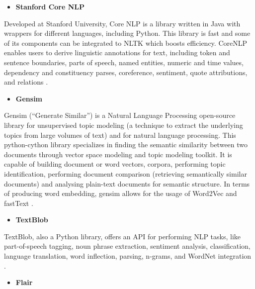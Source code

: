         \begin{itemize}
            \item\textbf{Stanford Core NLP}
        \end{itemize}
      

        \par Developed at Stanford University, Core NLP is a library written in Java with wrappers for different languages, including Python. This library is fast and some of its components can be integrated to NLTK which boosts efficiency. CoreNLP enables users to derive linguistic annotations for text, including token and sentence boundaries, parts of speech, named entities, numeric and time values, dependency and constituency parses, coreference, sentiment, quote attributions, and relations \cite{Manning2015}.

        \begin{itemize}
            \item\textbf{Gensim}
        \end{itemize}

    

        \par Gensim (\enquote{Generate Similar}) is a Natural Language Processing open-source library for unsupervised topic modeling (a technique to extract the underlying topics from large volumes of text)  and for natural language processing. This python-cython library specializes in finding the semantic similarity between two documents through vector space modeling and topic modeling toolkit. It is capable of building document or word vectors, corpora, performing topic identification, performing document comparison (retrieving semantically similar documents) and analysing plain-text documents for semantic structure. In terms of producing word embedding, gensim allows for the usage of Word2Vec and fastText \cite{rehurek_lrec}.
        
        \begin{itemize}
            \item\textbf{TextBlob}
        \end{itemize}

     

        TextBlob, also a Python library,  offers an API for performing NLP tasks, like part-of-speech tagging, noun phrase extraction, sentiment analysis, classification, language translation, word inflection, parsing, n-grams, and WordNet integration \cite{textblob}.

        \begin{itemize}
            \item\textbf{Flair}
        \end{itemize}
   

